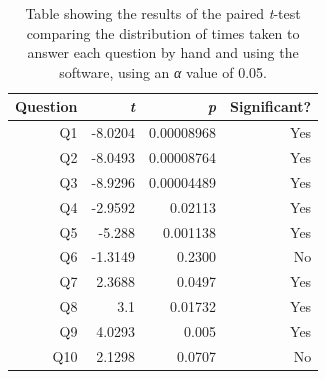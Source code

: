 \documentclass[12pt,twoside,notitlepage,xetex]{report}
\begin{document}
\begin{center}
\begin{table}[H]
\begin{center}
\begin{tabular}{|r|r|r|r|}
\hline
Question & \emph{t} & \emph{p} & Significant?\\ \hline \hline
Q1 & -8.0204 & 0.00008968 & Yes\\ \hline
Q2 & -8.0493 & 0.00008764 & Yes\\ \hline
Q3 & -8.9296 & 0.00004489 & Yes\\ \hline
Q4 & -2.9592 & 0.02113 & Yes\\ \hline
Q5 & -5.288 & 0.001138 & Yes\\ \hline
Q6 & -1.3149 & 0.2300 & No\\ \hline
Q7 & 2.3688 & 0.0497 & Yes\\ \hline
Q8 & 3.1 & 0.01732 & Yes\\ \hline
Q9 & 4.0293 & 0.005 & Yes\\ \hline
Q10 & 2.1298 & 0.0707 & No\\
\hline
\end{tabular}
\end{center}
\caption{Table showing the results of the paired \emph{t}-test comparing the distribution of times taken to answer each question by hand and using the software, using an \emph{α} value of 0.05.}
\label{tab:TTests}
\end{table}
\end{center}
\end{document}
